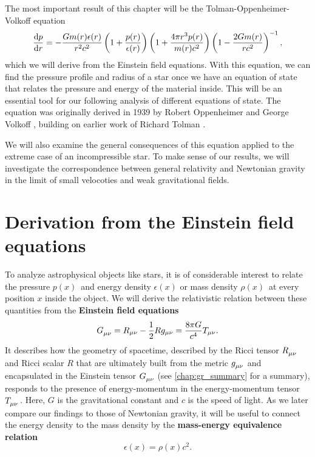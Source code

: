 The most important result of this chapter will be the Tolman-Oppenheimer-Volkoff equation
\begin{equation*}
	\odv{p}{r} = -\frac{G m(r) \epsilon(r)}{r^2 c^2} \left( 1 + \frac{p(r)}{\epsilon(r)} \right) \left( 1 + \frac{4 \pi r^3 p(r)}{m(r) c^2} \right) \left( 1 - \frac{2 G m(r)}{r c^2} \right)^{-1} ,
\end{equation*}
which we will derive from the Einstein field equations.
With this equation, we can find the pressure profile and radius of a star once we have an equation of state that relates the pressure and energy of the material inside.
This will be an essential tool for our following analysis of different equations of state.
The equation was originally derived in 1939 by Robert Oppenheimer and George Volkoff \cite{ref:tov}, building on earlier work of Richard Tolman \cite{ref:tolman}.

We will also examine the general consequences of this equation applied to the extreme case of an incompressible star. 
To make sense of our results, we will investigate the correspondence between general relativity and Newtonian gravity in the limit of small velocoties and weak gravitational fields.

\section{Derivation from the Einstein field equations}
\label{sec:einstein_to_tov}

To analyze astrophysical objects like stars, it is of considerable interest to relate the pressure $p(x)$ and energy density $\epsilon(x)$ or mass density $\rho(x)$ at every position $x$ inside the object.
We will derive the relativistic relation between these quantities from the \textbf{Einstein field equations} \cite[equation 4.44]{ref:carroll}
\begin{equation}
	G\indices{_\mu_\nu} = R_{\mu \nu} - \frac{1}{2} R g_{\mu \nu} = \frac{8 \pi G}{c^4} T_{\mu \nu} .
	\label{eq:einstein}
\end{equation}
It describes how the geometry of spacetime, described by the Ricci tensor $R\indices{_\mu_\nu}$ and Ricci scalar $R$ that are ultimately built from the metric $g\indices{_\mu_\nu}$ and encapsulated in the Einstein tensor $G\indices{_\mu_\nu}$ (see \cref{chap:gr_summary} for a summary), responds to the presence of energy-momentum in the energy-momentum tensor $T\indices{_\mu_\nu}$.
Here, $G$ is the gravitational constant and $c$ is the speed of light.
As we later compare our findings to those of Newtonian gravity, it will be useful to connect the energy density to the mass density by the \textbf{mass-energy equivalence relation}
\begin{equation}
	\epsilon(x) = \rho(x) c^2 .
	\label{eq:tov:mass_energy_equivalence}
\end{equation}

